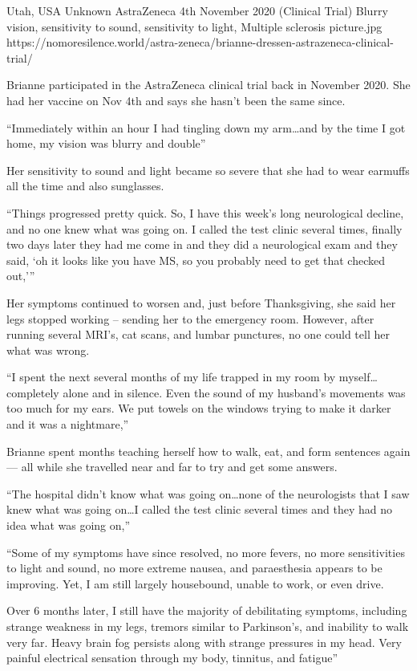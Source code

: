 {Utah, USA}
{Unknown}
{AstraZeneca}
{4th November 2020 (Clinical Trial)}
{Blurry vision, sensitivity to sound, sensitivity to light, Multiple sclerosis}
{picture.jpg}
{https://nomoresilence.world/astra-zeneca/brianne-dressen-astrazeneca-clinical-trial/}
{

Brianne participated in the AstraZeneca clinical trial back in November
2020. She had her vaccine on Nov 4th and says she hasn’t been the same since.

“Immediately within an hour I had tingling down my arm…and by the time I got
home, my vision was blurry and double”

Her sensitivity to sound and light became so severe that she had to wear
earmuffs all the time and also sunglasses.

“Things progressed pretty quick. So, I have this week’s long neurological
decline, and no one knew what was going on. I called the test clinic several
times, finally two days later they had me come in and they did a neurological
exam and they said, ‘oh it looks like you have MS, so you probably need to get
that checked out,’”

Her symptoms continued to worsen and, just before Thanksgiving, she said her
legs stopped working – sending her to the emergency room. However, after running
several MRI’s, cat scans, and lumbar punctures, no one could tell her what was
wrong.

“I spent the next several months of my life trapped in my room by
myself…completely alone and in silence. Even the sound of my husband’s movements
was too much for my ears. We put towels on the windows trying to make it darker
and it was a nightmare,”

Brianne spent months teaching herself how to walk, eat, and form sentences again
— all while she travelled near and far to try and get some answers.

“The hospital didn’t know what was going on…none of the neurologists that I saw
knew what was going on…I called the test clinic several times and they had no
idea what was going on,”

“Some of my symptoms have since resolved, no more fevers, no more sensitivities
to light and sound, no more extreme nausea, and paraesthesia appears to be
improving. Yet, I am still largely housebound, unable to work, or even drive.

Over 6 months later, I still have the majority of debilitating symptoms,
including strange weakness in my legs, tremors similar to Parkinson’s, and
inability to walk very far. Heavy brain fog persists along with strange
pressures in my head. Very painful electrical sensation through my body,
tinnitus, and fatigue”

}
